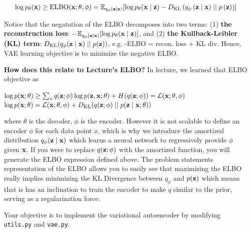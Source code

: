 \begin{equation} \label{eq:4}
    \log p_{\theta}(\mathbf{x}) \ge \text{ELBO}(\mathbf{x}; \theta, \phi) = \mathbb{E}_{q_{\phi}(\mathbf{z} \mid \mathbf{x})} [\log p_{\theta}(\mathbf{x} \mid \mathbf{z}) - D_{\text{KL}}\left(q_{\phi}\left(\mathbf{z} \mid \mathbf{x}\right) \mid\mid p\left(\mathbf{z}\right)\right)]
\end{equation}

Notice that the negatation of the ELBO decomposes into two terms: (1) \textbf{the reconstruction loss}: $- \mathbb{E}_{q_{\phi}(\mathbf{z} \mid \mathbf{x})}[\log p_{\theta}(\mathbf{x} \mid \mathbf{z})]$, and 
(2) \textbf{the Kullback-Leibler (KL) term}: $D_{\text{KL}} (q_{\phi}(\mathbf{z} \mid \mathbf{x}) \mid\mid p(\mathbf{z}))$, e.g. -ELBO = recon. loss + KL div. Hence,
VAE learning objective is to minimize the negative ELBO.

\textbf{How does this relate to Lecture's ELBO?} In lecture, we learned that ELBO objective as 
\begin{center}
    $\log p(\mathbf{x}; \theta) \ge \sum_{z}q(\mathbf{z}; \phi) \log p(\mathbf{z}, \mathbf{x}; \theta) + H(q(\mathbf{z}; \phi)) = \mathcal{L}(\mathbf{x}; \theta, \phi)$ \\
    $\log p(\mathbf{x}; \theta) = \mathcal{L}(\mathbf{x}; \theta, \phi) + D_{\text{KL}}(q(\mathbf{z}; \phi) \mid\mid p(\mathbf{z} \mid \mathbf{x}; \theta))$
\end{center}

where $\theta$ is the decoder, $\phi$ is the encoder. However it is not scalable to define an encoder $\phi$ for each data point $x$,
which is why we introduce the amortized distribution $q_{\phi}(\mathbf{z} \mid \mathbf{x})$ which learns a neural network to regressively provide $\phi$
given $\mathbf{x}$. If you were to replace $q(\mathbf{z}; \phi)$ with the amortized function, you will generate the ELBO expression defined above. The problem statements
representation of the ELBO allows you to easily see that maximizing the ELBO really implies minimizing the KL Divergence between $q_{\phi}$ and $p(\mathbf{z})$
which means that is has an inclination to train the encoder to make $q$ similar to the prior, serving as a regularization force.  

Your objective is to implement the variational autoencoder by modifying \texttt{utils.py} and \texttt{vae.py}.

